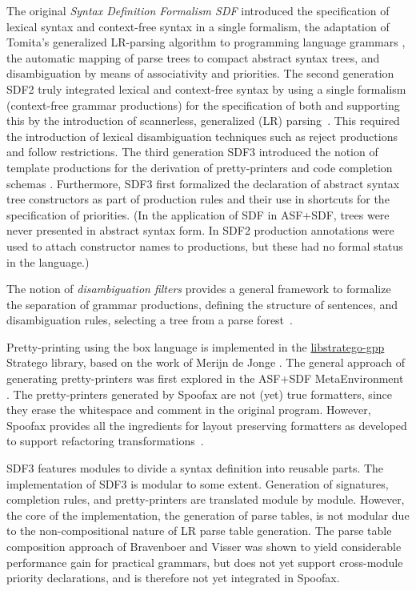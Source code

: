 The original \emph{Syntax Definition Formalism SDF} \cite{HeeringHKR89}
introduced the specification of lexical syntax and context-free syntax in a
single formalism, the adaptation of Tomita's generalized LR-parsing algorithm to
programming language grammars \cite{Rekers1992,Tomita85}, the automatic mapping
of parse trees to compact abstract syntax trees, and disambiguation by means of
associativity and priorities.
The second generation SDF2 truly integrated lexical and context-free syntax by
using a single formalism (context-free grammar productions) for the
specification of both \cite{Vis97.thesis,Visser-1997-SDF} and supporting this by
the introduction of scannerless, generalized (LR) parsing~\cite{Vis97.sglr}.
This required the introduction of lexical disambiguation techniques such as
reject productions and follow restrictions. The third generation SDF3 introduced
the notion of template productions for the derivation of pretty-printers and
code completion schemas \cite{VollebregtKV12}.
Furthermore, SDF3 first formalized the declaration of abstract syntax tree
constructors as part of production rules and their use in shortcuts for the
specification of priorities. (In the application of SDF in ASF+SDF, trees were
never presented in abstract syntax form. In SDF2 production annotations were
used to attach constructor names to productions, but these had no formal status
in the language.)

The notion of \emph{disambiguation filters} provides a general framework to
formalize the separation of grammar productions, defining the structure of
sentences, and disambiguation rules, selecting a tree from a parse
forest~\cite{KlintV94,BrandSVV02}.

Pretty-printing using the box language is implemented in the
\href{http://releases.strategoxt.org/docs/api/libstratego-gpp/stable/docs/}{libstratego-gpp}
Stratego library, based on the work of Merijn de Jonge \cite{Jonge02}. The
general approach of generating pretty-printers was first explored in the ASF+SDF
MetaEnvironment \cite{BV94,BrandV96}.
The pretty-printers generated by Spoofax are not (yet) true formatters, since
they erase the whitespace and comment in the original program. 
However, Spoofax provides all the ingredients for layout preserving formatters
as developed to support refactoring transformations~\cite{JongeV11}.

SDF3 features modules to divide a syntax definition into reusable parts. The
implementation of SDF3 is modular to some extent.
Generation of signatures, completion rules, and pretty-printers are translated
module by module. However, the core of the implementation, the generation of
parse tables, is not modular due to the non-compositional nature of LR parse
table generation. The parse table composition approach of Bravenboer and Visser
\cite{BravenboerV08} was shown to yield considerable performance gain for
practical grammars, but does not yet support cross-module priority declarations,
and is therefore not yet integrated in Spoofax.

